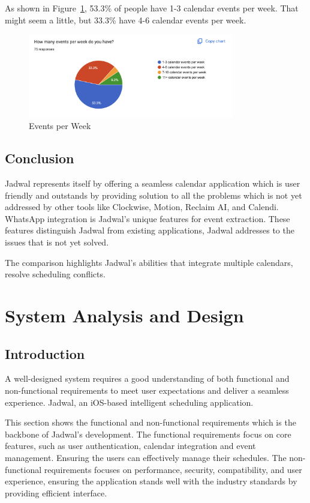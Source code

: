 \documentclass[12pt,a4paper]{report}
\begin{document}
As shown in Figure~\ref{fig:events-per-week}, 53.3\% of people have 1-3 calendar events per week. That might seem a little, but 33.3\% have 4-6 calendar events per week.

\begin{figure}[!h]
    \centering
    \includegraphics[width=0.8\textwidth]{images/survey/events-per-week.png}
    \caption{Events per Week}
    \label{fig:events-per-week}
\end{figure}

\section{Conclusion}

Jadwal represents itself by offering a seamless calendar application which is user friendly and outstands by providing solution to all the problems which is not yet addressed by other tools like Clockwise, Motion, Reclaim AI, and Calendi. WhatsApp integration is Jadwal’s unique features for event extraction. These features distinguish Jadwal from existing applications, Jadwal addresses to the issues that is not yet solved.

The comparison highlights Jadwal's abilities that integrate multiple calendars, resolve scheduling conflicts.

\chapter{System Analysis and Design}

\section{Introduction}

A well-designed system requires a good understanding of both functional and non-functional requirements to meet user expectations and deliver a seamless experience. Jadwal, an iOS-based intelligent scheduling application.

This section shows the functional and non-functional requirements which is the backbone of Jadwal's development. The functional requirements focus on core features, such as user authentication, calendar integration and event management. Ensuring the users can effectively manage their schedules. The non-functional requirements focuses on performance, security, compatibility, and user experience, ensuring the application stands well with the industry standards by providing efficient interface.
\end{document}
